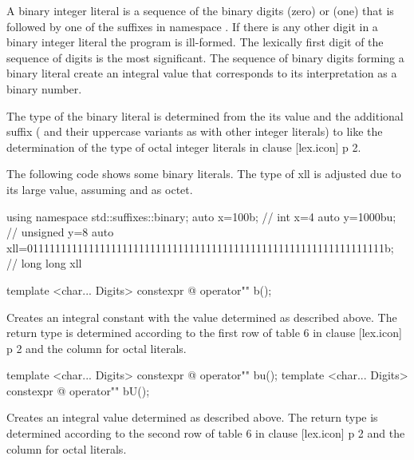 \documentclass[ebook,11pt,article]{memoir}
\begin{document}
\pnum
A binary integer literal is a sequence of the binary digits  (zero) or  (one) that is followed by one of the suffixes in namespace . If there is any other digit in a binary integer literal the program is ill-formed. The lexically first digit of the sequence of digits is the most significant. The sequence of binary digits forming a binary literal create an integral value that corresponds to its interpretation as a binary number.

\pnum
The type of the binary literal is determined from the its value and the additional suffix ( and their uppercase variants as with other integer literals) to  like the determination of the type of octal integer literals in clause [lex.icon] p 2.

\pnum
\enterexample 
The following code shows some binary literals. The type of xll is adjusted due to its large value, assuming  and  as octet.
\begin{codeblock}
{
    using namespace std::suffixes::binary;
    auto x=100b; // int x=4
    auto y=1000bu; // unsigned y=8
    auto xll=0111111111111111111111111111111111111111111111111111111111111111b;
         // long long xll
}
\end{codeblock}
\exitexample

\begin{itemdecl}
template <char... Digits>
constexpr @\seebelow@ 
operator"" b();
\end{itemdecl}

\begin{itemdescr}
\pnum
\effects
Creates an integral constant with the value determined as described above. The return type is determined according to the first row of table 6 in clause [lex.icon] p 2 and the column for octal literals. 
\end{itemdescr}

\begin{itemdecl}
template <char... Digits>
constexpr @\seebelow@ 
operator"" bu();
template <char... Digits>
constexpr @\seebelow@ 
operator"" bU();
\end{itemdecl}

\begin{itemdescr}
\pnum
\effects
Creates an integral value determined as described above. The return type is determined according to the second row of table 6 in clause [lex.icon] p 2 and the column for octal literals. 
\end{itemdescr}
\end{document}
